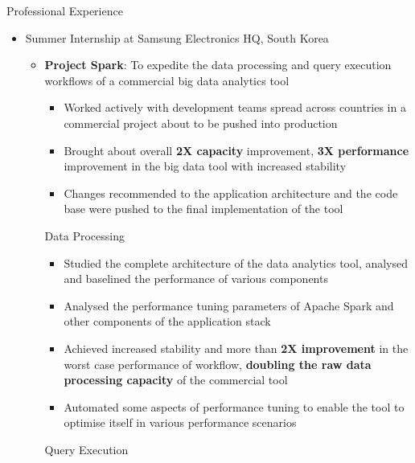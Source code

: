 \documentclass{article}
\begin{document}
{\Large Professional Experience}
\renewcommand{\labelitemi}{}
\renewcommand\labelitemii{$\circ$}
\renewcommand{\labelitemiii}{$\bullet$}
\begin{itemize}[leftmargin=0.07cm]
\item {\large Summer Internship at Samsung Electronics HQ, South Korea}\hspace*{\fill}
\vspace{-0cm}

\begin{itemize}[leftmargin=0.07cm]
	\item \textbf{Project Spark}: To expedite the data processing and query execution workflows	of a commercial big data analytics tool
	\begin{itemize}
	\item Worked actively with development teams spread across countries in a commercial project about to be pushed into production
	\item Brought about overall \textbf{2X capacity} improvement, \textbf{3X performance} improvement in the big data tool with increased stability
	\item Changes recommended to the application architecture and the code base were pushed to the final implementation of the tool
	\end{itemize}
	Data Processing\\ \vspace{-0.2cm}
	\begin{itemize}
	\item Studied the complete architecture of the data analytics tool, analysed and baselined the performance of various components
	\item Analysed the performance tuning parameters of Apache Spark and other components of the application stack
    \item Achieved increased stability and more than \textbf{2X improvement} in the worst case performance of workflow, \textbf{doubling the raw data processing capacity} of the commercial tool
    \item Automated some aspects of performance tuning to enable the tool to optimise itself in various performance scenarios
    \end{itemize}
    \hspace{0.1cm}Query Execution\\   \vspace{-0.2cm}
	\begin{itemize}

\end{itemize}
\end{itemize}
\end{itemize}
\end{document}
